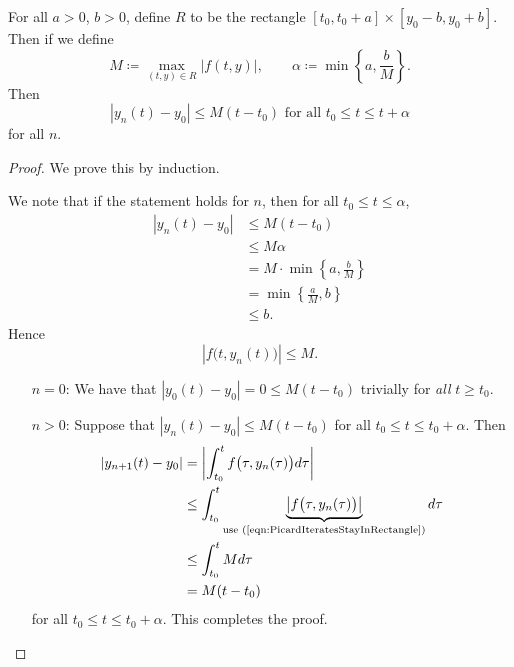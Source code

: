 \documentclass{article}
\begin{document}
\begin{lemma}
    For all $a > 0$, $b > 0$, define $R$ to be the rectangle $[t_0, t_0 + a] \times [y_0-b,y_0+b]$.
    Then if we define
    \[
        M
        \coloneq
        \max_{(t,y) \in R}
        |f(t,y)|, \qquad
        \alpha
        \coloneq
        \min\left\{a,\frac{b}{M}\right\}.
    \]
    Then 
    \begin{equation}
        |y_n(t)-y_0| \leq M(t-t_0)
        \text{ for all }
        t_0 \leq t \leq t + \alpha
    \end{equation}
    for all $n$.
\end{lemma}
\begin{proof}
    We prove this by induction.

    We note that if the statement holds for $n$, then for all $t_0 \leq t \leq \alpha$,
    \begin{align*}
        |y_n(t) - y_0| 
        &\leq 
        M(t-t_0) \\
        &\leq 
        M\alpha \\
        &=
        M \cdot \min\left\{a, \frac{b}{M}\right\} \\
        &=
        \min\left\{\frac{a}{M}, b\right\} \\
        &\leq 
        b.
    \end{align*}
    Hence
    \begin{equation}
        \label{eqn:PicardIteratesStayInRectangle}
        |f\big(t, y_n(t)\big)| \leq M.
    \end{equation}

    \begin{itemize}
        \item[$n=0$:]
            We have that $|y_0(t) - y_0| = 0 \leq M(t-t_0)$ trivially for \textit{all} $t \geq t_0$.
        \item[$n > 0$:]
            Suppose that $|y_n(t) - y_0| \leq M(t-t_0)$ for all $t_0 \leq t \leq t_0 + \alpha$.
            Then
            \begin{align*}
                |y_{n+1}(t)-y_0|
                &=
                \left\lvert
                    \int_{t_0}^t
                    f\big(\tau, y_n(\tau)\big)
                    d\tau
                \right\rvert
                \\
                &\leq
                \int_{t_0}^t
                \underbrace{
                    \left\lvert
                        f\big(\tau, y_n(\tau)\big)
                    \right\rvert
                }_{\text{use (\ref{eqn:PicardIteratesStayInRectangle})}}
                d\tau
                \\
                &\leq
                \int_{t_0}^t
                M
                d\tau
                \\
                &=
                M(t-t_0)
            \end{align*}
            for all $t_0 \leq t \leq t_0 + \alpha$.
            This completes the proof.
    \end{itemize}
\end{proof}
\end{document}
